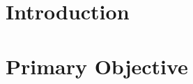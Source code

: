 \documentclass[conference]{IEEEtran} %
\begin{document}

\section{Introduction}
\label{sec:introduction}





\section{Primary Objective}
\label{sec:primary-obj}
\end{document}
